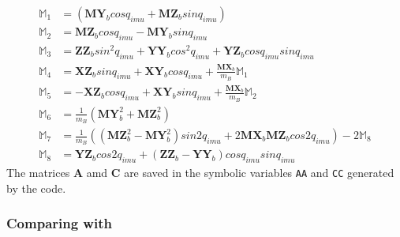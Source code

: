 \documentclass[a4paper,10pt]{article}
\begin{document}
\begin{align}
 \mathbb{M}_1 &= \left(\mathbf{MY}_bcosq_{imu}+\mathbf{MZ}_bsinq_{imu}\right) \nonumber \\
 \mathbb{M}_2 &= \mathbf{MZ}_bcosq_{imu}-\mathbf{MY}_bsinq_{imu} \nonumber \\
 \mathbb{M}_3 &= \mathbf{ZZ}_bsin^2q_{imu}+\mathbf{YY}_bcos^2q_{imu}+\mathbf{YZ}_bcosq_{imu}sinq_{imu} \nonumber \\
 \mathbb{M}_4 &= \mathbf{XZ}_bsinq_{imu}+\mathbf{XY}_bcosq_{imu}+\frac{\mathbf{MX}_b}{m_B}\mathbb{M}_1 \nonumber \\
 \mathbb{M}_5 &= -\mathbf{XZ}_bcosq_{imu}+\mathbf{XY}_bsinq_{imu}+\frac{\mathbf{MX}_b}{m_B}\mathbb{M}_2 \nonumber \\
 \mathbb{M}_6 &= \frac{1}{m_B}\left(\mathbf{MY}_b^2+\mathbf{MZ}_b^2\right) \nonumber \\
 \mathbb{M}_7 &= \frac{1}{m_B}\left(\left(\mathbf{MZ}_b^2-\mathbf{MY}_b^2\right)sin2q_{imu}+2\mathbf{MX}_b\mathbf{MZ}_bcos2q_{imu}\right) - 2\mathbb{M}_8 \nonumber \\
 \mathbb{M}_8 &= \mathbf{YZ}_bcos2q_{imu}+\left(\mathbf{ZZ}_b-\mathbf{YY}_b\right)cosq_{imu}sinq_{imu} \nonumber 
\end{align}
The matrices $\mathbf{A}$ amd $\mathbf{C}$ are saved in the symbolic variables \texttt{AA} and \texttt{CC} generated by the code.

\subsubsection{Comparing with \cite{kim2005dynamic}}
\end{document}
